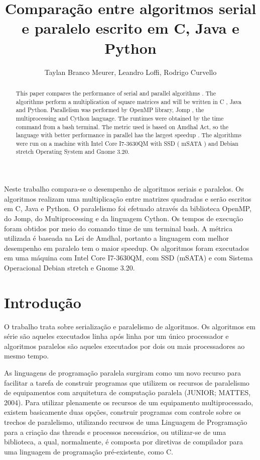 \documentclass[a4paper,12pt]{article}
\title{Comparação entre algoritmos serial e paralelo escrito em C, Java e Python\\}
\author{Taylan Branco Meurer\inst{1}, Leandro Loffi\inst{1}, Rodrigo Curvello\inst{2}}
\begin{document}
 

\maketitle

\begin{abstract}
This paper compares the performance of serial and parallel algorithms . The algorithms perform a multiplication of square matrices and will be written in C , Java and Python. Parallelism was performed by OpenMP library, Jomp , the multiprocessing and Cython language. The runtimes were obtained by the time command from a bash terminal. The metric used is based on Amdhal Act, so the language with better performance in parallel has the largest speedup . The algorithms were run on a machine with Intel Core I7-3630QM with SSD ( mSATA ) and Debian stretch Operating System and Gnome 3.20. 
\end{abstract}

\begin{resumo}
Neste trabalho compara-se o desempenho de algoritmos seriais e paralelos. Os algoritmos realizam uma multiplicação entre matrizes quadradas e serão escritos em C, Java e Python. O paralelismo foi efetuado através da biblioteca OpenMP, do Jomp, do Multiprocessing e da linguagem Cython. Os tempos de execução foram obtidos por meio do comando time de um terminal bash. A métrica utilizada é baseada na Lei de Amdhal, portanto a linguagem com melhor desempenho em paralelo tem o maior speedup. Os algoritmos foram executados em uma máquina com Intel Core I7-3630QM, com SSD (mSATA) e com Sistema Operacional Debian stretch e Gnome 3.20.
\end{resumo}
\section{Introdução}

O trabalho trata sobre serialização e paralelismo de algoritmos. Os algoritmos em série são aqueles executados linha após linha por um único processador e algoritmos paralelos são aqueles executados por dois ou mais processadores ao mesmo tempo. 

	As linguagens de programação paralela surgiram como um novo recurso para facilitar a tarefa de construir programas que utilizem os recursos de paralelismo de equipamentos com arquitetura de computação paralela (JUNIOR; MATTES, 2004). Para utilizar plenamente os recursos de um equipamento multiprocessado, existem basicamente duas opções, construir programas com controle sobre os trechos de paralelismo, utilizando recursos de uma Linguagem de Programação para a criação das threads e processos necessários, ou utilizar-se de uma biblioteca, a qual, normalmente, é composta por diretivas de compilador para uma linguagem de programação pré-existente, como C.
	 
\end{document}
